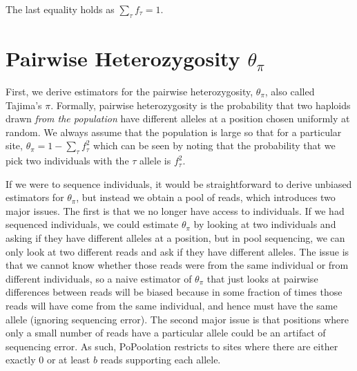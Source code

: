 \documentclass[a4paper,fontsize=9pt,DIV=14]{scrartcl}
\begin{document}
The last equality holds as $\sum_\tau f_\tau = 1$.


\section{Pairwise Heterozygosity \texorpdfstring{$\theta_\pi$}{}}
\label{supp:sec:ThetaPi}

First, we derive estimators for the pairwise heterozygosity, $\theta_\pi$, also called Tajima's $\pi$.  Formally, pairwise heterozygosity is the probability that two haploids drawn \emph{from the population} have different alleles at a position chosen uniformly at random.  We always assume that the population is large so that for a particular site, $\theta_\pi = 1 -\sum_\tau f_\tau^2$ which can be seen by noting that the probability that we pick two individuals with the $\tau$ allele is $f_\tau^2$.

If we were to sequence individuals, it would be straightforward to derive unbiased estimators for $\theta_\pi$, but instead we obtain a pool of reads, which introduces two major issues.  The first is that we no longer have access to individuals.  If we had sequenced individuals, we could estimate $\theta_\pi$ by looking at two individuals and asking if they have different alleles at a position, but in pool sequencing, we can only look at two different reads and ask if they have different alleles.  The issue is that we cannot know whether those reads were from the same individual or from different individuals, so a naive estimator of $\theta_\pi$ that just looks at pairwise differences between reads will be biased because in some fraction of times those reads will have come from the same individual, and hence must have the same allele (ignoring sequencing error).  The second major issue is that positions where only a small number of reads have a particular allele could be an artifact of sequencing error.  As such, PoPoolation restricts to sites where there are either exactly $0$ or at least $b$ reads supporting each allele.
\end{document}
